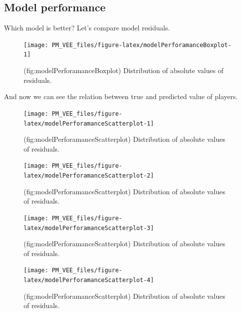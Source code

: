 \documentclass[12pt,]{krantz}
\begin{document}
\hypertarget{model-performance}{%
\subsection{Model performance}\label{model-performance}}

Which model is better?
Let's compare model residuals.

\begin{figure}

{\centering \texttt{[image: PM\_VEE\_files/figure-latex/modelPerforamanceBoxplot-1]} 

}

\caption{(fig:modelPerforamanceBoxplot) Distribution of absolute values of residuals.}\label{fig:modelPerforamanceBoxplot}
\end{figure}

And now we can see the relation between true and predicted value of players.

\begin{figure}

{\centering \texttt{[image: PM\_VEE\_files/figure-latex/modelPerforamanceScatterplot-1]} 

}

\caption{(fig:modelPerforamanceScatterplot) Distribution of absolute values of residuals.}\label{fig:modelPerforamanceScatterplot1}
\end{figure}
\begin{figure}

{\centering \texttt{[image: PM\_VEE\_files/figure-latex/modelPerforamanceScatterplot-2]} 

}

\caption{(fig:modelPerforamanceScatterplot) Distribution of absolute values of residuals.}\label{fig:modelPerforamanceScatterplot2}
\end{figure}
\begin{figure}

{\centering \texttt{[image: PM\_VEE\_files/figure-latex/modelPerforamanceScatterplot-3]} 

}

\caption{(fig:modelPerforamanceScatterplot) Distribution of absolute values of residuals.}\label{fig:modelPerforamanceScatterplot3}
\end{figure}
\begin{figure}

{\centering \texttt{[image: PM\_VEE\_files/figure-latex/modelPerforamanceScatterplot-4]} 

}

\caption{(fig:modelPerforamanceScatterplot) Distribution of absolute values of residuals.}\label{fig:modelPerforamanceScatterplot4}
\end{figure}
\end{document}
